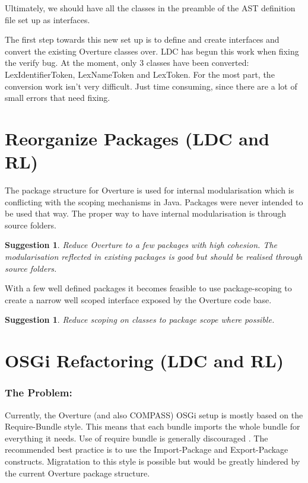 \documentclass[11pt]{overturerep} \usepackage{t1enc,times,a4,t1enc}
\newtheorem{sug}[subsection]{Suggestion}
\begin{document}
Ultimately, we should have all the classes in the preamble of the AST
definition file set up as interfaces.

The first step towards this new set up is to define and create interfaces
and convert the existing Overture classes over. LDC has begun this work
when fixing the verify bug. At the moment, only 3 classes have been
converted: \textsf{LexIdentifierToken}, \textsf{LexNameToken} and
\textsf{LexToken}. For the most part, the conversion work isn't very
difficult. Just time consuming, since there are a lot of small errors that
need fixing.





\section{Reorganize Packages (LDC and RL)} The package structure for
Overture is used for internal modularisation which is conflicting with the
scoping mechanisms in Java.  Packages were never intended to be used that
way. The proper way to have internal modularisation is through source
folders.

\begin{sug} 
    Reduce Overture to a few packages with high cohesion. The
    modularisation reflected in existing packages is good but should be realised
    through source folders.  
\end{sug}

With a few well defined packages it becomes feasible to use package-scoping to
create a narrow well scoped interface exposed by the Overture code base.

\begin{sug} 
    Reduce scoping on classes to package scope where possible.
\end{sug}





\section{OSGi Refactoring (LDC and RL)} \label{sec:osgi} 

\subsubsection{The Problem:} Currently, the Overture (and also COMPASS)
OSGi setup is mostly based on the \textsf{Require-Bundle} style. This means
that each bundle imports the whole bundle for everything it needs. Use of
require bundle is generally discouraged \cite{osgi2013}. The recommended
best practice is to use the \textsf{Import-Package} and
\textsf{Export-Package} constructs. Migratation to this style is possible
but would be greatly hindered by the current Overture package structure.
\end{document}
